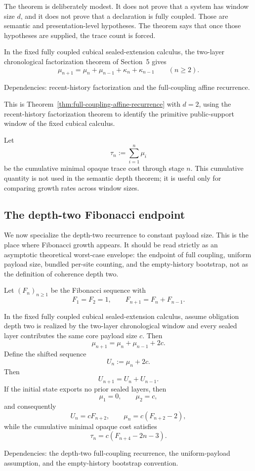 \documentclass{lmcs}
\begin{document}
The theorem is deliberately modest.  It does not prove that a system has window size \(d\),
and it does not prove that a declaration is fully coupled.  Those are semantic and
presentation-level hypotheses.  The theorem says that once those hypotheses are supplied, the
trace count is forced.

\begin{cor}
\label{cor:depth-two-full-coupling-recurrence}
In the fixed fully coupled cubical sealed-extension calculus, the two-layer chronological
factorization theorem of Section~5 gives
\[
  \mu_{n+1}
  =
  \mu_n+\mu_{n-1}+\kappa_n+\kappa_{n-1}
  \qquad (n\geq 2).
\]

Dependencies: recent-history factorization and the full-coupling affine recurrence.
\end{cor}

This is Theorem~\ref{thm:full-coupling-affine-recurrence} with \(d=2\), using the
recent-history factorization theorem to identify the primitive public-support window of the
fixed cubical calculus.

Let
\[
  \tau_n := \sum_{i=1}^{n}\mu_i
\]
be the cumulative minimal opaque trace cost through stage \(n\).  This cumulative quantity is
not used in the semantic depth theorem; it is useful only for comparing growth rates across
window sizes.

\subsection{The depth-two Fibonacci endpoint}
\label{subsec:fibonacci-endpoint}

We now specialize the depth-two recurrence to constant payload size.  This is the place where
Fibonacci growth appears.  It should be read strictly as an asymptotic theoretical
worst-case envelope: the endpoint of full coupling, uniform payload size, bundled per-site
counting, and the empty-history bootstrap, not as the definition of coherence depth two.

Let \((F_n)_{n\geq 1}\) be the Fibonacci sequence with
\[
  F_1=F_2=1,
  \qquad
  F_{n+1}=F_n+F_{n-1}.
\]

\begin{cor}
\label{cor:affine-fibonacci-envelope}
In the fixed fully coupled cubical sealed-extension calculus, assume obligation depth two is
realized by the two-layer chronological window and every sealed layer contributes the same
core payload size \(c\).  Then
\[
  \mu_{n+1}=\mu_n+\mu_{n-1}+2c.
\]
Define the shifted sequence
\[
  U_n := \mu_n+2c.
\]
Then
\[
  U_{n+1}=U_n+U_{n-1}.
\]
If the initial state exports no prior sealed layers, then
\[
  \mu_1=0,
  \qquad
  \mu_2=c,
\]
and consequently
\[
  U_n=cF_{n+2},
  \qquad
  \mu_n=c(F_{n+2}-2),
\]
while the cumulative minimal opaque cost satisfies
\[
  \tau_n=c(F_{n+4}-2n-3).
\]

Dependencies: the depth-two full-coupling recurrence, the uniform-payload assumption, and
the empty-history bootstrap convention.
\end{cor}
\end{document}
